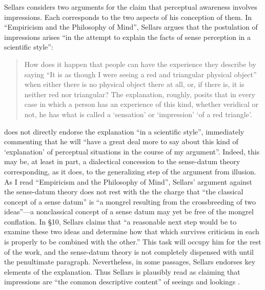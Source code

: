 \documentclass[12pt]{article}
\begin{document}
Sellars considers two arguments for the claim that perceptual awareness involves impressions. Each corresponds to the two aspects of his conception of them. In ``Empiricism and the Philosophy of Mind'', Sellars argues that the postulation of impressions arises ``in the attempt to explain the facts of sense perception in a scientific style'':
\begin{quote}
    How does it happen that people can have the experience they describe by saying ``It is as though I were seeing a red and triangular physical object'' when either there is no physical object there at all, or, if there is, it is neither red nor triangular? The explanation, roughly, posits that in every case in which a person has an experience of this kind, whether veridical or not, he has what is called a `sensation' or `impression' `of a red triangle'.  \citep[§7]{Sellars:1956xp}
\end{quote}
\cite[§7]{Sellars:1956xp} does not directly endorse the explanation ``in a scientific style'', immediately commenting that he will ``have a great deal more to say about this kind of `explanation' of perceptual situations in the course of my argument''. Indeed, this may be, at least in part, a dialectical concession to the sense-datum theory corresponding, as it does, to the generalizing step of the argument from illusion. As I read ``Empiricism and the Philosophy of Mind'', Sellars' \citeyearpar[§7]{Sellars:1956xp} argument against the sense-datum theory does not rest with the the charge that ``the classical concept of a sense datum'' is ``a mongrel resulting from the crossbreeding of two ideas''---a nonclassical concept of a sense datum may yet be free of the mongrel conflation. In §10, Sellars claims that ``a reasonable next step would be to examine these two ideas and determine how that which survives criticism in each is properly to be combined with the other.'' This task will occupy him for the rest of the work, and the sense-datum theory is not completely dispensed with until the penultimate paragraph. Nevertheless, in some passages, Sellars endorses key elements of the explanation. Thus Sellars is plausibly read as claiming that impressions are ``the common descriptive content'' of seeings and lookings \citep[see][167]{Williams:2008fk}. %
\end{document}

